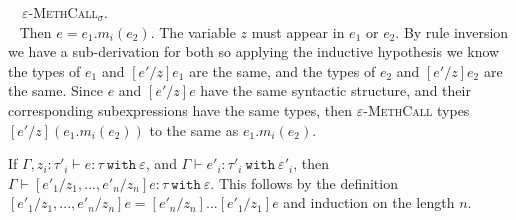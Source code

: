 \documentclass{llncs}
\newcommand{\keywadj}[1]{\mathtt{#1}}
\newcommand{\keyw}[1]{\keywadj{#1}~}
\newcommand{\proofcase}[2]{
	\begin{adjustwidth}{1.5em}{0pt}
		\fbox{Case.}~~#1. \\ ~#2
	\end{adjustwidth}
}
\begin{document}
{	\proofcase{\textsc{$\varepsilon$-MethCall$_\sigma$}} {
		Then $e =e _1.m_i(e_2)$. The variable $z$ must appear in $e_1$ or $e_2$. By rule inversion we have a sub-derivation for both so applying the inductive hypothesis we know the types of $e_1$ and $[e'/z]e_1$ are the same, and the types of $e_2$ and $[e'/z]e_2$ are the same. Since $e$ and $[e'/z]e$ have the same syntactic structure, and their corresponding subexpressions have the same types, then \textsc{$\varepsilon$-MethCall} types $[e'/z](e_1.m_i(e_2))$ to the same as $e_1.m_i(e_2)$.
	}
}

\noindent
{} If $\Gamma, z_i : \tau'_i \vdash e : \tau~\keyw{with} \varepsilon$, and $\Gamma \vdash e'_i : \tau'_i~\keyw{with} \varepsilon'_i$, then $\Gamma \vdash [e'_1/z_1, ..., e'_n/z_n]e : \tau~\keyw{with} \varepsilon$. This follows by the definition $[e'_1/z_1, ..., e'_n/z_n]e = [e'_n/z_n]...[e'_1/z_1]e$ and induction on the length $n$. \\
\end{document}

